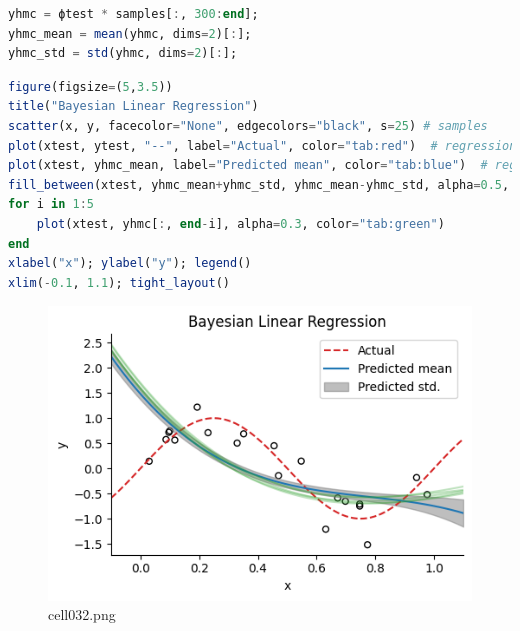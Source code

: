 \begin{lstlisting}[language=julia]
yhmc = ϕtest * samples[:, 300:end];
yhmc_mean = mean(yhmc, dims=2)[:];
yhmc_std = std(yhmc, dims=2)[:];
\end{lstlisting}
\begin{lstlisting}[language=julia]
figure(figsize=(5,3.5))
title("Bayesian Linear Regression")
scatter(x, y, facecolor="None", edgecolors="black", s=25) # samples
plot(xtest, ytest, "--", label="Actual", color="tab:red")  # regression line
plot(xtest, yhmc_mean, label="Predicted mean", color="tab:blue")  # regression line
fill_between(xtest, yhmc_mean+yhmc_std, yhmc_mean-yhmc_std, alpha=0.5, color="tab:gray", label="Predicted std.")
for i in 1:5
    plot(xtest, yhmc[:, end-i], alpha=0.3, color="tab:green")
end
xlabel("x"); ylabel("y"); legend()
xlim(-0.1, 1.1); tight_layout()
\end{lstlisting}
\begin{figure}[ht]
	\centering
	\includegraphics[scale=0.8, max width=\linewidth]{./fig/bayesian-brain/mcmc/cell032.png}
	\caption{cell032.png}
	\label{cell032.png}
\end{figure}
